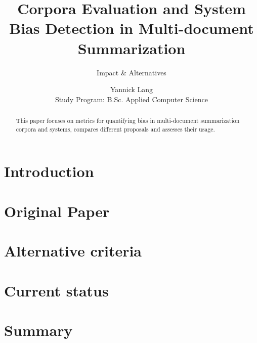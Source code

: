 \documentclass[runningheads]{llncs}
\begin{document}
\title{Corpora Evaluation and System Bias Detection in Multi-document Summarization}
\subtitle{Impact \& Alternatives}
\author{Yannick Lang \\
    \small Study Program: B.Sc. Applied Computer Science }

\maketitle              %


\begin{abstract}
    This paper focuses   on metrics for quantifying bias in multi-document summarization corpora and systems, compares different proposals and assesses their usage.
    
    
\end{abstract}

\section{Introduction}
\label{sec:introcution}


\section{Original Paper}
\label{sec:original-paper}


\section{Alternative criteria}
\label{sec:alternative-criteria}


\section{Current status}
\label{sec:current-status}


\section{Summary}
\label{sec:summary}





\end{document}
